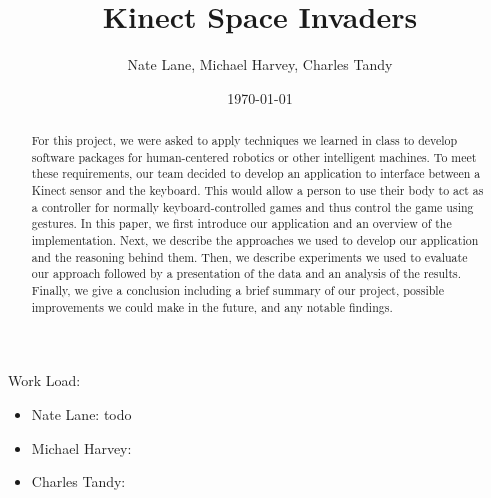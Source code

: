\documentclass[12pt,conference]{IEEEtran}
\title{Kinect Space Invaders}
\date{\today}
\author{Nate Lane, Michael Harvey, Charles Tandy}
\begin{document}
\maketitle
\thispagestyle{plain}
\pagestyle{plain}
\begin{abstract}
\indent
For this project, we were asked to apply techniques we learned in class to develop software packages for human-centered robotics or other intelligent machines. To meet these requirements, our team decided to develop an application to interface between a Kinect sensor and the keyboard. This would allow a person to use their body to act as a controller for normally keyboard-controlled games and thus control the game using gestures. In this paper, we first introduce our application and an overview of the implementation. Next, we describe the approaches we used to develop our application and the reasoning behind them. Then, we describe experiments we used to evaluate our approach followed by a presentation of the data and an analysis of the results. Finally, we give a conclusion including a brief summary of our project, possible improvements we could make in the future, and any notable findings.
\end{abstract}




\appendix
Work Load:
\begin{itemize}
\item Nate Lane: todo
\item Michael Harvey:
\item Charles Tandy: 
\end{itemize}
\end{document}
